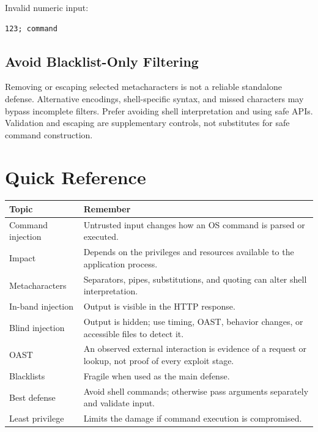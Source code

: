 \documentclass[12pt,a4paper]{article}
\newcommand{\nsection}[1]{\section{#1}}
\newcommand{\nsubsection}[1]{\subsection{#1}}
\begin{document}
Invalid numeric input:

\begin{lstlisting}
123; command
\end{lstlisting}

\vspace{0.5cm}
\nsubsection{Avoid Blacklist-Only Filtering}

Removing or escaping selected metacharacters is not a reliable
standalone defense. Alternative encodings, shell-specific syntax,
and missed characters may bypass incomplete filters.
Prefer avoiding shell interpretation and using safe APIs.
Validation and escaping are supplementary controls, not substitutes
for safe command construction.

\newpage
\nsection{Quick Reference}

\vspace{0.5cm}

\begin{longtable}{>{\raggedright\arraybackslash}p{}
        >{\raggedright\arraybackslash}p{}}
    \toprule
    \textbf{Topic}    & \textbf{Remember}                            \\
    \midrule
    Command injection &
    Untrusted input changes how an OS command is parsed or executed. \\
    Impact            &
    Depends on the privileges and resources available to the
    application process.                                             \\
    Metacharacters    &
    Separators, pipes, substitutions, and quoting can alter
    shell interpretation.                                            \\
    In-band injection &
    Output is visible in the HTTP response.                          \\
    Blind injection   &
    Output is hidden; use timing, OAST, behavior changes, or
    accessible files to detect it.                                   \\
    OAST              &
    An observed external interaction is evidence of a request or
    lookup, not proof of every exploit stage.                        \\
    Blacklists        &
    Fragile when used as the main defense.                           \\
    Best defense      &
    Avoid shell commands; otherwise pass arguments separately
    and validate input.                                              \\
    Least privilege   &
    Limits the damage if command execution is compromised.           \\
    \bottomrule
\end{longtable}
\end{document}
